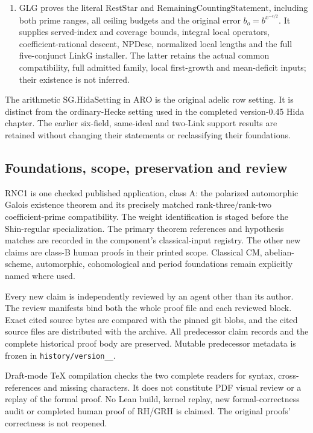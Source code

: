 \begin{enumerate}
\item GLG proves the literal \(\mathrm{RestStar}\) and
\(\mathrm{RemainingCountingStatement}\), including both prime
ranges, all ceiling budgets and the original error
\(b_o=b^{x^{-\epsilon/2}}\). It supplies served-index and coverage
bounds, integral local operators, coefficient-rational descent,
\(\mathrm{NPDesc}\), normalized local lengths and the full
five-conjunct \(\mathrm{LinkG}\) installer. The latter retains the
actual common compatibility, full admitted family, local first-growth
and mean-deficit inputs; their existence is not inferred.
\end{enumerate}

The arithmetic \(\mathrm{SG.HidaSetting}\) in ARO is the original
adelic row setting. It is distinct from the ordinary-Hecke setting
used in the completed version-0.45 Hida chapter. The earlier six-field,
same-ideal and two-Link support results are retained without changing
their statements or reclassifying their foundations.

\subsection{Foundations, scope, preservation and review}

RNC1 is one checked published application, class A: the polarized
automorphic Galois existence theorem and its precisely matched
rank-three/rank-two coefficient-prime compatibility. The weight
identification is staged before the Shin-regular specialization.
The primary theorem references and hypothesis matches are recorded
in the component's classical-input registry. The other new claims
are class-B human proofs in their printed scope. Classical CM,
abelian-scheme, automorphic, cohomological and period foundations
remain explicitly named where used.

Every new claim is independently reviewed by an agent other than its
author. The review manifests bind both the whole proof file and each
reviewed block. Exact cited source bytes are compared with the pinned
git blobs, and the cited source files are distributed with the archive.
All predecessor claim records and the complete historical proof body
are preserved. Mutable predecessor metadata is frozen in
\texttt{history/\allowbreak version\_\_}.

Draft-mode TeX compilation checks the two complete readers for syntax,
cross-references and missing characters. It does not constitute PDF
visual review or a replay of the formal proof. No Lean build, kernel
replay, new formal-correctness audit or completed human proof of RH/GRH
is claimed. The original proofs' correctness is not reopened.

